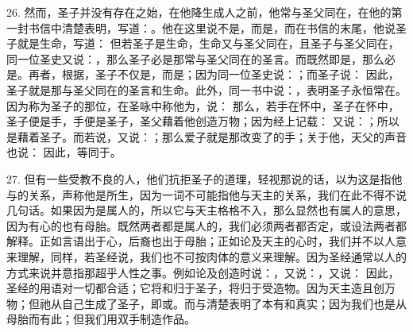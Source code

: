 26. 然而，圣子并没有存在之始，在他降生成人之前，他常与圣父同在，在他的第一封书信中清楚表明，写道：。他在这里说不是，而是，而在书信的末尾，他说圣子就是生命，写道： 但若圣子是生命，生命又与圣父同在，且圣子与圣父同在，同一位圣史又说：，那么圣子必是那常与圣父同在的圣言。而既然即是，那么必是。再者，根据，圣子不仅是，而是；因为同一位圣史说：；而圣子说： 因此，圣子就是那与圣父同在的圣言和生命。此外，同一书中说：，表明圣子永恒常在。因为称为圣子的那位，在圣咏中称他为，说： 那么，若手在怀中，圣子在怀中，圣子便是手，手便是圣子，圣父藉着他创造万物；因为经上记载： 又说：；所以是藉着圣子。而若说，又说：；那么爱子就是那改变了的手；关于他，天父的声音也说： 因此，等同于。\par

27. 但有一些受教不良的人，他们抗拒圣子的道理，轻视那说的话，以为这是指他与的关系，声称他是所生，因为一词不可能指他与天主的关系，我们在此不得不说几句话。如果因为是属人的，所以它与天主格格不入，那么显然也有属人的意思，因为有心的也有母胎。既然两者都是属人的，我们必须两者都否定，或设法两者都解释。正如言语出于心，后裔也出于母胎；正如论及天主的心时，我们并不以人意来理解，同样，若圣经说，我们也不可按肉体的意义来理解。因为圣经通常以人的方式来说并意指那超乎人性之事。例如论及创造时说：，又说：，又说： 因此，圣经的用语对一切都合适；它将和归于圣子，将归于受造物。因为天主造且创万物；但祂从自己生成了圣子，即或。而与清楚表明了本有和真实；因为我们也是从母胎而有此；但我们用双手制造作品。\par

